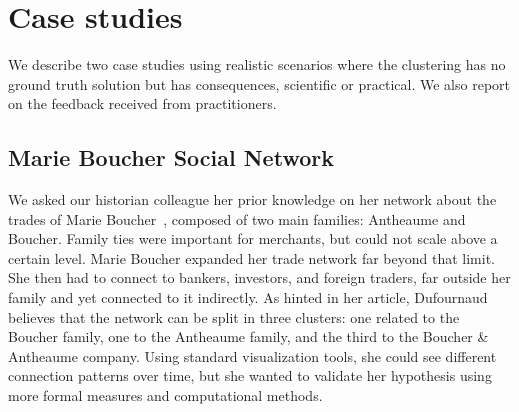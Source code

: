 
\section{Case studies}

We describe two case studies using realistic scenarios where the clustering has no ground truth solution but has consequences, scientific or practical. We also report on the feedback received from practitioners.

\subsection{Marie Boucher Social Network}
\label{sud:MB}

We asked our historian colleague her prior knowledge on her network about the trades of Marie Boucher~\cite{Dufournaud17},  %
composed of two main families: Antheaume and Boucher. Family ties were important for merchants, but could not scale above a certain level. Marie Boucher expanded her trade network far beyond that limit. She then had to connect to bankers, investors, and foreign traders, far outside her family and yet connected to it indirectly. %
As hinted in her article, Dufournaud believes that the network can be split in three clusters: one related to the Boucher family, one to the Antheaume family, and the third to the Boucher \& Antheaume company. Using standard visualization tools, she could see different connection patterns over time, but she wanted to validate her hypothesis using more formal measures and computational methods.



